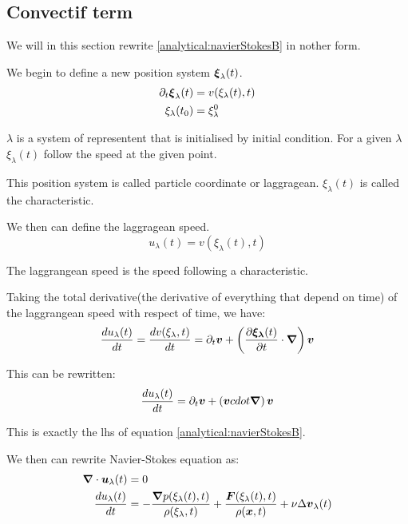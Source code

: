\subsection{Convectif term}
\label{analytical:convectif}
We will in this section rewrite \ref{analytical:navierStokesB} in nother form.

We begin to define a new position system ${\boldsymbol {\xi}}_{\lambda}(t)$.
\begin{align}
 \partial_t {\boldsymbol {\xi}}_{\lambda}(t)&=v(\xi_{\lambda}(t),t)\\
 \xi_{\lambda}(t_0)&=\xi^{0}_{\lambda}
\end{align}

$\lambda$ is a system of representent that is initialised by initial condition.
For a given $\lambda$ $\xi_{\lambda}(t)$ follow the speed at the given point.

This position system is called particle coordinate or laggragean.
$\xi_\lambda(t)$ is called the characteristic.

We then can define the laggragean speed.
\begin{equation}
 u_{\lambda}(t)=v(\xi_{\lambda}(t),t)
\end{equation}

The laggrangean speed is the speed following a characteristic.

Taking the total derivative(the derivative of everything that depend on time) of the laggrangean speed with respect of time, we have:
\begin{equation}
\frac{d u_{\lambda}(t)}{d t}=\frac{d v(\xi_{\lambda},t)}{d t}=\partial_t {\boldsymbol {v}}+\left(\frac{\partial {\boldsymbol {\xi_{\lambda}}}(t)}{\partial t}\cdot{\boldsymbol {\nabla}}\right){\boldsymbol {v}}
\end{equation}

This can be rewritten:
\begin{equation}
\frac{d u_{\lambda}(t)}{d t}=\partial_t {\boldsymbol {v}}+\left({\boldsymbol {v}} cdot{\boldsymbol {\nabla}}\right){\boldsymbol {v}}
\end{equation}

This is exactly the lhs of equation \ref{analytical:navierStokesB}.

We then can rewrite Navier-Stokes equation as:
\begin{align}
\label{analytical:navierStokesLagA}
{\boldsymbol {\nabla}} \cdot {\boldsymbol {u}}_{\lambda}(t)&=0\\
\label{analytical:navierStokesLagB}
\frac{d u_{\lambda}(t)}{d t}&=-\frac{{\boldsymbol {\nabla}} p(\xi_{\lambda}(t),t)}{\rho(\xi_{\lambda},t)}+\frac{{\boldsymbol {F}}(\xi_{\lambda}(t),t)}{\rho({\boldsymbol {x}},t)}+\nu \Delta {\boldsymbol {v}}_{\lambda}(t)
\end{align}

